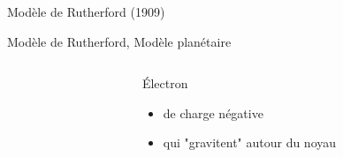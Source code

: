 \documentclass[handout,8pt]{beamer} %
\begin{document}
\begin{frame}{Modèle de Rutherford (1909)}
\begin{block}{Modèle de Rutherford, Modèle planétaire}
\begin{description}
\begin{columns}
\begin{column}{0.35\textwidth}
					\end{column}
					\begin{column}{0.35\textwidth}
					\item[Électron]
			\begin{itemize}
				\item de charge négative
				\item qui "gravitent" autour du noyau
			\end{itemize}
					\end{column}
				\end{columns}
		\end{description}
		                                                                                                                                                                                                                                                                                                                                                                                                                                                                                                                                                                                                                                                                                                                                                                                                                                                                                                                                                                                                                                                                                                                                                                                                                                                                                                                                                                                                                                                                                                                                                                                                                                                                                                                                                                                                                                                                                                                                                                                                                                                                                                                                                                                                                                                                                                                                                                                                                                                                                                                                                                                                       
\end{block}
\end{frame}
\end{document}
